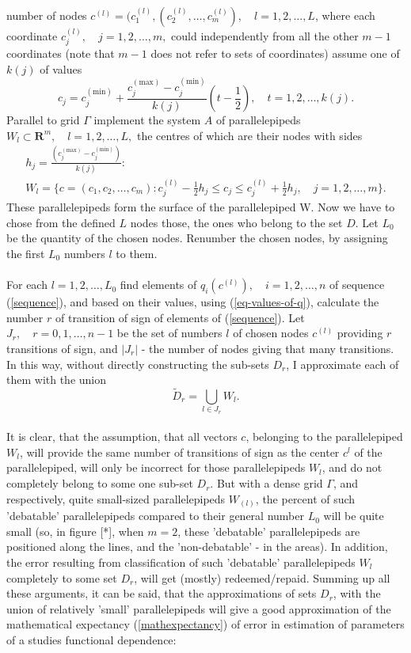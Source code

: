 \documentclass[11pt,a4paper]{article}
\numberwithin{equation}{subsection}
\begin{document}
number of nodes $c^{(l)} = (c_{1}^{(l)},(c_{2}^{(l)},\dots,c_{m}^{(l)}),\quad l=1,2,\dots,L$, where each coordinate $c_{j}^{(l)}, \quad j=1,2,\dots,m,$ could independently from all the other $m-1$ coordinates (note that $m-1$ does not refer to sets of coordinates) assume one of $k(j)$ of values
\begin{equation}
c_{j}=c_{j}^{(\text{min})} + \frac{c_{j}^{(\text{max})}-c_{j}^{(\text{min})}}{k(j)}(t-\frac{1}{2}), \quad t=1,2,\dots,k(j).
\end{equation}
Parallel to grid $\Gamma$ implement the system $A$ of parallelepipeds $W_{l} \subset \boldsymbol{R}^{m}, \quad l=1,2,\dots,L,$ the centres of which are their nodes with sides
\begin{gather}
h_{j} = \frac{(c_{j}^{(\text{max})}-c_{j}^{(\text{min})})}{k(j)}: \\
W_{l} = \lbrace c=(c_{1},c_{2},\dots,c_{m}):c_{j}^{(l)}-\frac{1}{2} h_{j} \leq c_{j} \leq c_{j}^{(l)}+\frac{1}{2} h_{j}, \quad j=1,2,\dots,m \rbrace .
\end{gather}
These parallelepipeds form the surface of the parallelepiped W. Now we have to chose from the defined $L$ nodes those, the ones who belong to the set $D$. Let $L_{0}$ be the quantity of the chosen nodes. Renumber the chosen nodes, by assigning the first $L_{0}$ numbers $l$ to them. \\
\\
For each $l=1,2,\dots,L_{0}$ find elements of $q_{i}(c^{(l)}), \quad i=1,2,\dots,n$ of sequence (\ref{sequence}), and based on their values, using (\ref{eq-values-of-q}), calculate the number $r$ of transition of sign of elements of (\ref{sequence}). Let $J_{r}, \quad r=0,1,\dots,n-1$ be the set of numbers $l$ of chosen nodes $c^{(l)}$ providing $r$ transitions of sign, and $|J_{r}|$ - the number of nodes giving that many transitions. In this way, without directly constructing the sub-sets $D_{r}$, I approximate each of them with the union
\begin{equation}
\tilde{D}_{r} = \bigcup_{l \in J_{r}} W_{l}.
\end{equation}
\\
It is clear, that the assumption, that all vectors $c$, belonging to the parallelepiped $W_{l}$, will provide the same number of transitions of sign as the center $c^{l}$ of the parallelepiped, will only be incorrect for those parallelepipeds $W_{l}$, and do not completely belong to some one sub-set $D_{r}$. But with a dense grid $\Gamma$, and respectively, quite small-sized parallelepipeds $W_{(l)}$, the percent of such 'debatable' parallelepipeds compared to their general number $L_{0}$ will be quite small (so, in figure [*], when $m=2$, these 'debatable' parallelepipeds are positioned along the lines, and the 'non-debatable' - in the areas). In addition, the error resulting from classification of such 'debatable' parallelepipeds $W_{l}$ completely to some set $D_{r}$, will get (mostly) redeemed/repaid. Summing up all these arguments, it can be said, that the approximations of sets $D_{r}$, with the union of relatively 'small' parallelepipeds will give a good  approximation of the mathematical expectancy (\ref{mathexpectancy}) of error in estimation of parameters of a studies functional dependence:
\end{document}

